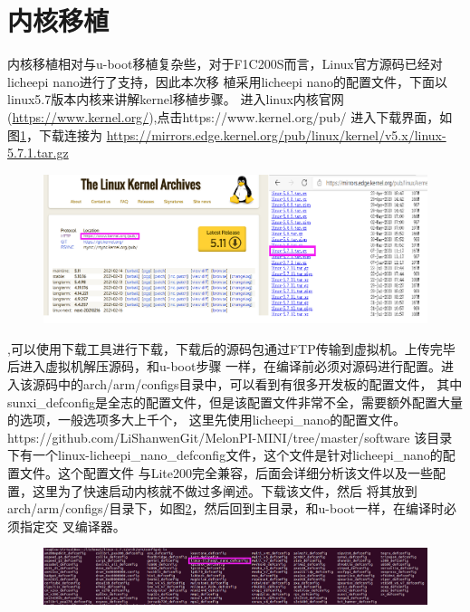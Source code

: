 \section{内核移植}
内核移植相对与u-boot移植复杂些，对于F1C200S而言，Linux官方源码已经对licheepi nano进行了支持，因此本次移
植采用licheepi nano的配置文件，下面以linux5.7版本内核来讲解kernel移植步骤。
进入linux内核官网(\href{https://www.kernel.org/}{https://www.kernel.org/}),点击https://www.kernel.org/pub/
进入下载界面，如图\ref{fig:linuxkernel}，下载连接为
\href{https://mirrors.edge.kernel.org/pub/linux/kernel/v5.x/linux-5.7.1.tar.gz}{https://mirrors.edge.kernel.org/pub/linux/kernel/v5.x/linux-5.7.1.tar.gz}
\begin{figure}[htbp]
	\centering
	\includegraphics[width=1\linewidth]{chapter2/img/linuxkernel}
	\caption{}
	\label{fig:linuxkernel}
\end{figure}
,可以使用下载工具进行下载，下载后的源码包通过FTP传输到虚拟机。上传完毕后进入虚拟机解压源码，和u-boot步骤
一样，在编译前必须对源码进行配置。进入该源码中的arch/arm/configs目录中，可以看到有很多开发板的配置文件，
其中sunxi\_defconfig是全志的配置文件，但是该配置文件非常不全，需要额外配置大量的选项，一般选项多大上千个，
这里先使用licheepi\_nano的配置文件。https://github.com/LiShanwenGit/MelonPI-MINI/tree/master/software
该目录下有一个linux-licheepi\_nano\_defconfig文件，这个文件是针对licheepi\_nano的配置文件。这个配置文件
与Lite200完全兼容，后面会详细分析该文件以及一些配置，这里为了快速启动内核就不做过多阐述。下载该文件，然后
将其放到arch/arm/configs/目录下，如图\ref{fig:configs}，然后回到主目录，和u-boot一样，在编译时必须指定交
叉编译器。
\begin{figure}[htbp]
	\centering
	\includegraphics[width=1\linewidth]{chapter2/img/configs}
	\caption{}
	\label{fig:configs}
\end{figure}

